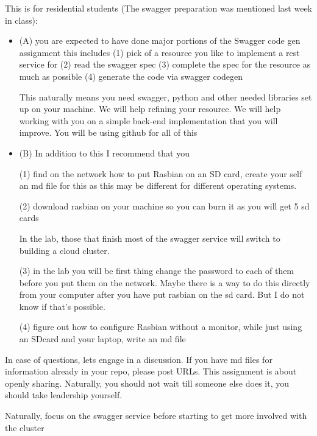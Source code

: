 \begin{exercise}
  This is for residential students (The swagger preparation was
  mentioned last week in class):
 \begin{itemize}
\item (A) you are expected to have done major portions of the Swagger code gen assignment this includes
\subitem (1) pick of a resource you like to implement a rest service for
\subitem (2) read the swagger spec
\subitem (3) complete the spec for the resource as much as possible
\subitem (4) generate the code via swagger codegen
 
This naturally means you need swagger, python and other needed
libraries set up on your machine. We will help refining your
resource. We will help working with you on a simple back-end
implementation that you will improve. You will be using github for all
of this

\smallskip
\item (B) In addition to this I recommend that you
 
\subitem (1) find on the network how to put Rasbian on an SD card,
create your self an md file for this as this may be different for
different operating systems.

 
\subitem (2) download rasbian on your machine so you can burn it as
you will get 5 sd cards
 
In the lab, those that finish most of the swagger service will switch
to building a cloud cluster.
 
\subitem (3) in the lab you will be first thing change the password to
each of them before you put them on the network. Maybe there is a way
to do this directly from your computer after you have put rasbian on
the sd card. But I do not know if that's possible.

 
\subitem (4) figure out how to configure Rasbian without a monitor,
while just using an SDcard and your laptop, write an md file

 \end{itemize}
 
In case of questions, lets engage in a discussion. If you have md
files for information already in your repo, please post URLs. This
assignment is about openly sharing. Naturally, you should not wait
till someone else does it, you should take leadership yourself.

 
Naturally, focus on the swagger service before starting to get more
involved with the cluster

\end{exercise}

